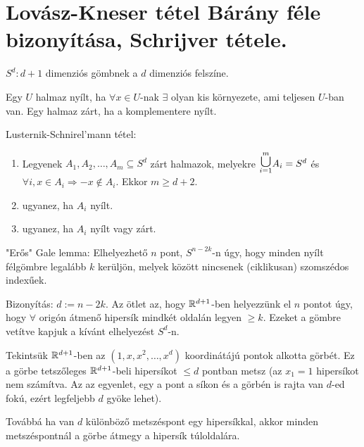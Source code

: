 \chapter{Lovász-Kneser tétel Bárány féle bizonyítása, Schrijver tétele.}

\begin{notation}
  $S^d: d+1$ dimenziós gömbnek a $d$ dimenziós felszíne.
\end{notation}

\begin{dfn}
  Egy $U$ halmaz nyílt, ha $\forall x \in U$-nak $\exists$ olyan kis környezete, ami teljesen $U$-ban van. Egy halmaz zárt, ha a komplementere nyílt.
\end{dfn}

\begin{thm} Lusternik-Schnirel'mann tétel:
  \begin{enumerate}
    \item Legyenek $A_1, A_2, \dots, A_m \subseteq S^d$ zárt halmazok, melyekre
    $\cuploop{m}{i=1} A_i = S^d$ és $\forall i, x \in A_i \Rightarrow -x \not \in A_i$. Ekkor $m \geq d + 2$.
    \item ugyanez, ha $A_i$ nyílt.
    \item ugyanez, ha $A_i$ nyílt vagy zárt.
  \end{enumerate}
\end{thm}

\begin{thm} "Erős" Gale lemma:
  Elhelyezhető $n$ pont, $S^{n-2k}$-n úgy, hogy minden nyílt félgömbre legalább $k$ kerüljön, melyek között nincsenek (ciklikusan) szomszédos indexűek.
\end{thm}

Bizonyítás:
$d := n - 2k$. Az ötlet az, hogy $\mathbb{R}^{d+1}$-ben helyezzünk el $n$ pontot úgy, hogy $\forall$ origón átmenő hipersík mindkét oldalán legyen $\geq k$. Ezeket a gömbre vetítve kapjuk a kívánt elhelyezést $S^d$-n.

\medskip

Tekintsük $\mathbb{R}^{d+1}$-ben az $(1, x, x^2, \dots, x^d)$ koordinátájú pontok alkotta görbét. Ez a görbe tetszőleges $\mathbb{R}^{d+1}$-beli hipersíkot $\leq d$ pontban metsz (az $x_1 = 1$ hipersíkot nem számítva. Az az egyenlet, egy a pont a síkon és a görbén is rajta van $d$-ed fokú, ezért legfeljebb $d$ gyöke lehet).

\medskip

Továbbá ha van $d$ különböző metszéspont egy hipersíkkal, akkor minden metszéspontnál a görbe átmegy a hipersík túloldalára.

